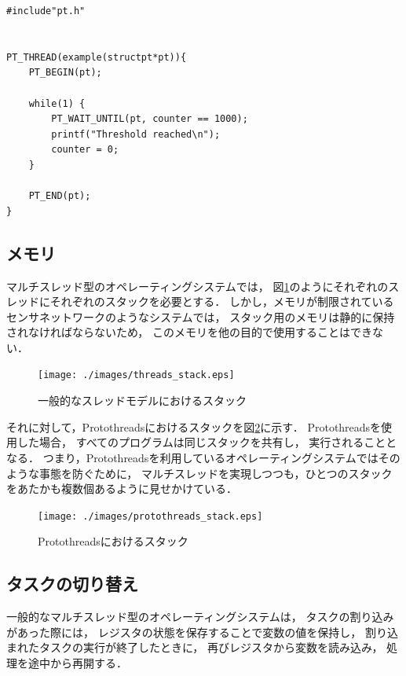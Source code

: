 \begin{lstlisting}[caption=Protothredsを使用した場合, label={lst:using-protothreads}]
#include"pt.h"


PT_THREAD(example(structpt*pt)){
    PT_BEGIN(pt);

    while(1) {
        PT_WAIT_UNTIL(pt, counter == 1000);
        printf("Threshold reached\n");
        counter = 0;
    }
    
    PT_END(pt); 
}
\end{lstlisting}




\subsection{メモリ}
マルチスレッド型のオペレーティングシステムでは，
図\ref{fig:threads_stack}のようにそれぞれのスレッドにそれぞれのスタックを必要とする．
しかし，メモリが制限されているセンサネットワークのようなシステムでは，
スタック用のメモリは静的に保持されなければならないため，
このメモリを他の目的で使用することはできない．
\begin{figure}[htbp]
 \begin{center}
  \texttt{[image: ./images/threads\_stack.eps]}
 \end{center}
 \caption{一般的なスレッドモデルにおけるスタック}
 \label{fig:threads_stack}
\end{figure}

それに対して，Protothreadsにおけるスタックを図\ref{fig:protothreads_stack}に示す．
Protothreadsを使用した場合，
すべてのプログラムは同じスタックを共有し，
実行されることとなる．
つまり，Protothreadsを利用しているオペレーティングシステムではそのような事態を防ぐために，
マルチスレッドを実現しつつも，ひとつのスタックをあたかも複数個あるように見せかけている．
\begin{figure}[htbp]
 \begin{center}
  \texttt{[image: ./images/protothreads\_stack.eps]}
 \end{center}
 \caption{Protothreadsにおけるスタック}
 \label{fig:protothreads_stack}
\end{figure}


\subsection{タスクの切り替え}
一般的なマルチスレッド型のオペレーティングシステムは，
タスクの割り込みがあった際には，
レジスタの状態を保存することで変数の値を保持し，
割り込まれたタスクの実行が終了したときに，
再びレジスタから変数を読み込み，
処理を途中から再開する．

